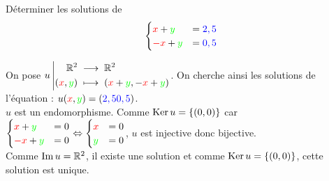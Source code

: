 \documentclass{book}
\begin{document}
\begin{Exercice}
Déterminer les solutions de 
$$
\begin{cases}
{\color{red}x}+{\color{green}y}&={\color{blue}2,5}\\
{\color{red}-x}+{\color{green}y}&={\color{blue}0,5}
\end{cases}
$$
\begin{Demonstration}
On pose $ {u}\left|\begin{aligned}{\mathbb{R}^2}&\;\longrightarrow\;{\mathbb{R}^2}\\{( {\color{red}x }   ,  {\color{green}y})}&\;\longmapsto\;{ ({\color{red}x }   +  {\color{green}y},-{\color{red}x }   +  {\color{green}y})}\end{aligned}\right.$.
On cherche ainsi les solutions de l'équation :  $u( {\color{red}x }   ,  {\color{green}y})	 = ( {\color{blue}2,5}   {\color{blue}0,5})$.\\
$u$ est un endomorphisme. Comme $\operatorname{Ker} u=\{(0,0)\}$ car 
$
\begin{cases}
{\color{red}x}+{\color{green}y}&=0\\
{\color{red}-x}+{\color{green}y}&=0
\end{cases}\Leftrightarrow\begin{cases}
{\color{red}x}&=0\\
{\color{green}y}&=0
\end{cases}
$, $u$ est injective donc bijective.\\
 Comme $\operatorname{Im} u=\mathbb{R}^2$, il existe une solution et comme $\operatorname{Ker} u=\{(0,0)\}$, cette solution est unique. 
\end{Demonstration}


\end{Exercice}
\end{document}
